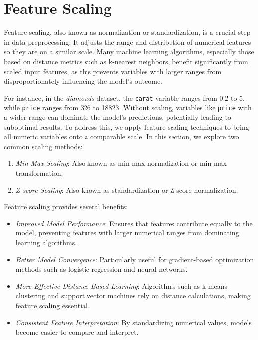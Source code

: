 \documentclass[
  11pt,
]{book}
\newcommand{\passthrough}[1]{#1}
\providecommand{\tightlist}{%
  \setlength{\itemsep}{0pt}\setlength{\parskip}{0pt}}
\theoremstyle{definition}
\theoremstyle{definition}
\theoremstyle{definition}
\theoremstyle{definition}
\theoremstyle{remark}
\begin{document}
\section{Feature Scaling}\label{feature-scaling}

Feature scaling, also known as normalization or standardization, is a crucial step in data preprocessing. It adjusts the range and distribution of numerical features so they are on a similar scale. Many machine learning algorithms, especially those based on distance metrics such as k-nearest neighbors, benefit significantly from scaled input features, as this prevents variables with larger ranges from disproportionately influencing the model's outcome.

For instance, in the \emph{diamonds} dataset, the \passthrough{\lstinline!carat!} variable ranges from 0.2 to 5, while \passthrough{\lstinline!price!} ranges from 326 to 18823. Without scaling, variables like \passthrough{\lstinline!price!} with a wider range can dominate the model's predictions, potentially leading to suboptimal results. To address this, we apply feature scaling techniques to bring all numeric variables onto a comparable scale. In this section, we explore two common scaling methods:

\begin{enumerate}
\def\labelenumi{\arabic{enumi}.}
\tightlist
\item
  \emph{Min-Max Scaling}: Also known as min-max normalization or min-max transformation.
\item
  \emph{Z-score Scaling}: Also known as standardization or Z-score normalization.
\end{enumerate}

Feature scaling provides several benefits:

\begin{itemize}
\tightlist
\item
  \emph{Improved Model Performance}: Ensures that features contribute equally to the model, preventing features with larger numerical ranges from dominating learning algorithms.
\item
  \emph{Better Model Convergence}: Particularly useful for gradient-based optimization methods such as logistic regression and neural networks.
\item
  \emph{More Effective Distance-Based Learning}: Algorithms such as k-means clustering and support vector machines rely on distance calculations, making feature scaling essential.
\item
  \emph{Consistent Feature Interpretation}: By standardizing numerical values, models become easier to compare and interpret.
\end{itemize}
\end{document}
